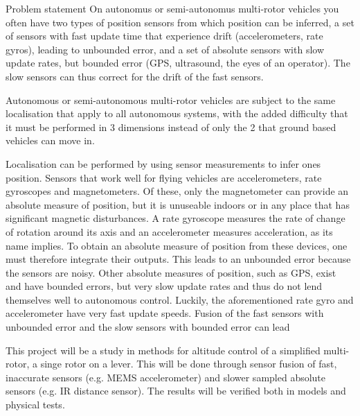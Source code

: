

Problem statement
On autonomus or semi-autonomus multi-rotor vehicles you often have two
types of position sensors from which position can be inferred, a set of
sensors with fast update time that experience drift (accelerometers, rate
gyros), leading to unbounded error, and a set of absolute sensors with
slow update rates, but bounded error (GPS, ultrasound, the eyes of an
operator).
The slow sensors can thus correct for the drift of the fast sensors.

Autonomous or semi-autonomous multi-rotor vehicles are subject to the 
same localisation that apply to all autonomous systems, with the added
difficulty that it must be performed in 3 dimensions instead of only 
the 2 that ground based vehicles can move in. 

Localisation can be performed by using sensor measurements to infer
ones position. Sensors that work well for flying vehicles are accelerometers,
rate gyroscopes and magnetometers. Of these, only the magnetometer can provide
an absolute measure of position, but it is unuseable indoors or in any place
that has significant magnetic disturbances. A rate gyroscope measures the
rate of change of rotation around its axis and an accelerometer measures
acceleration, as its name implies. To obtain an absolute measure of position
from these devices, one must therefore integrate their outputs. This leads
to an unbounded error because the sensors are noisy. Other absolute measures 
of position, such as GPS, exist and have bounded errors, but very slow update
rates and thus do not lend themselves well to autonomous control. Luckily,
the aforementioned rate gyro and accelerometer have very fast update speeds.
Fusion of the fast sensors with unbounded error and the slow sensors with bounded
error can lead 


This project will be a study in methods for altitude control of a
simplified multi-rotor, a singe rotor on a lever. This will be done
through sensor fusion of fast, inaccurate sensors (e.g. MEMS
accelerometer) and slower sampled absolute sensors (e.g. IR distance
sensor). The results will be verified both in models and physical tests.

